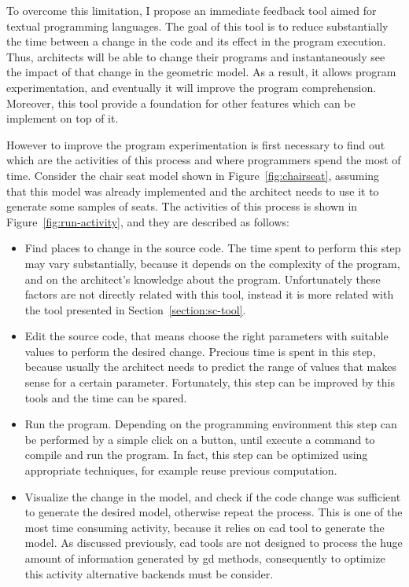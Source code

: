 To overcome this limitation, I propose an immediate feedback tool aimed for textual programming languages. The goal of this tool is to reduce substantially the time between a change in the code and its effect in the program execution. Thus, architects will be able to change their programs and instantaneously see the impact of that change in the geometric model. As a result, it allows program experimentation, and eventually it will improve the program comprehension. Moreover, this tool provide a foundation for other features which can be implement on top of it.

However to improve the program experimentation is first necessary to find out which are the activities of this process and where programmers spend the most of time. Consider the chair seat model shown in Figure~\ref{fig:chairseat}, assuming that this model was already implemented and the architect needs to use it to generate some samples of seats. The activities of this process is shown in Figure~\ref{fig:run-activity}, and they are described as follows:

\begin{itemize}
\item Find places to change in the source code. The time spent to perform this step may vary substantially, because it depends on the complexity of the program, and on the architect's knowledge about the program. Unfortunately these factors are not directly related with this tool, instead it is more related with the tool presented in Section~\ref{section:sc-tool}.

\item Edit the source code, that means choose the right parameters with suitable values to perform the desired change. Precious time is spent in this step, because usually the architect needs to predict the range of values that makes sense for a certain parameter. Fortunately, this step can be improved by this tools and the time can be spared.

\item Run the program. Depending on the programming environment this step can be performed by a simple click on a button, until execute a command to compile and run the program. In fact, this step can be optimized using appropriate techniques, for example reuse previous computation.

\item Visualize the change in the model, and check if the code change was sufficient to generate the desired model, otherwise repeat the process. This is one of the most time consuming activity, because it relies on \gls{cad} tool to generate the model. As discussed previously, \gls{cad} tools are not designed to process the huge amount of information generated by \gls{gd} methods, consequently to optimize this activity alternative backends must be consider.   
\end{itemize}

